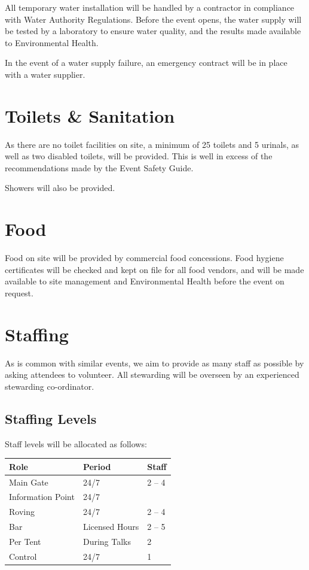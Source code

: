 All temporary water installation will be handled by a contractor in compliance with Water Authority Regulations.
Before the event opens, the water supply will be tested by a laboratory to ensure water quality, and the results
made available to Environmental Health.

In the event of a water supply failure, an emergency contract will be in place with a water supplier.

\section{Toilets \& Sanitation}

As there are no toilet facilities on site, a minimum of 25 toilets and 5 urinals, as well as two disabled toilets,
will be provided. This is well in excess of the recommendations made by the Event Safety Guide.

Showers will also be provided.

\section{Food}

Food on site will be provided by commercial food concessions. Food hygiene certificates will be checked and kept on
file for all food vendors, and will be made available to site management and Environmental Health before the event
on request.

\section{Staffing}

As is common with similar events, we aim to provide as many staff as possible
by asking attendees to volunteer. All stewarding will be overseen by an experienced stewarding co-ordinator.

\subsection{Staffing Levels}

Staff levels will be allocated as follows:

\begin{tabular}{l l l}
Role & Period & Staff \\
\hline
Main Gate & 24/7 & 2 -- 4 \\
Information Point & 24/7 & \\
Roving & 24/7 & 2 -- 4 \\
Bar & Licensed Hours & 2 -- 5 \\
Per Tent & During Talks & 2 \\
Control & 24/7 & 1
\end{tabular}


